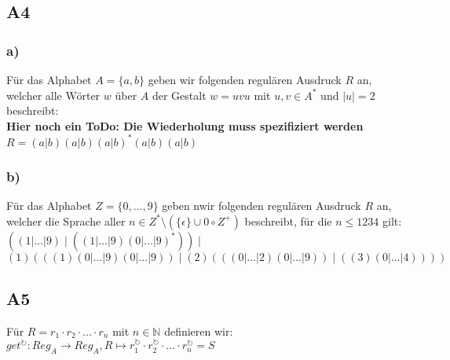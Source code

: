 \documentclass[12pt, a4paper]{article}
\begin{document}
\subsection*{A4}
\subsubsection*{a)}
Für das Alphabet \(A = \{a,b\}\) geben wir folgenden regulären Ausdruck \(R\) an, 
welcher alle Wörter \(w\) über \(A\) der Gestalt \(w = uvu\) mit \(u,v \in A^*\) 
und \(\vert u \vert = 2\) beschreibt: \\
\textbf{Hier noch ein ToDo: Die Wiederholung muss spezifiziert werden}\\
\(R = (a | b)(a | b)(a | b)^*(a | b)(a | b)\)
\subsubsection*{b)}
Für das Alphabet \(Z = \{0, \dots, 9\}\) geben nwir folgenden regulären Ausdruck \(R\) 
an, welcher die Sprache aller \(n \in Z^* \setminus  ( \{\epsilon\} \cup 0 \circ Z^+)\) 
beschreibt, für die \(n \leq 1234\) gilt: \\
\(((1 | \dots | 9)\mid ((1 | \dots | 9)(0 | \dots | 9)^*)) \mid \)\\ 
\((1)(((1)(0 | \dots | 9)(0 | \dots | 9)) \mid (2)(((0 | \dots | 2)(0 | \dots | 9)) \mid ((3)(0 | \dots | 4))))\)

\pagebreak
\subsection*{A5}
Für \(R = r_1 \cdot r_2 \cdot \dots \cdot r_n\) mit \(n \in \mathbb{N}\) definieren wir: \\
\(get^{\circlearrowright} : Reg_A \rightarrow Reg_A, R \mapsto r_{1}^{\circlearrowright} \cdot r_{2}^{\circlearrowright} \cdot \dots \cdot r_{n}^{\circlearrowright} = S\)
\end{document}
